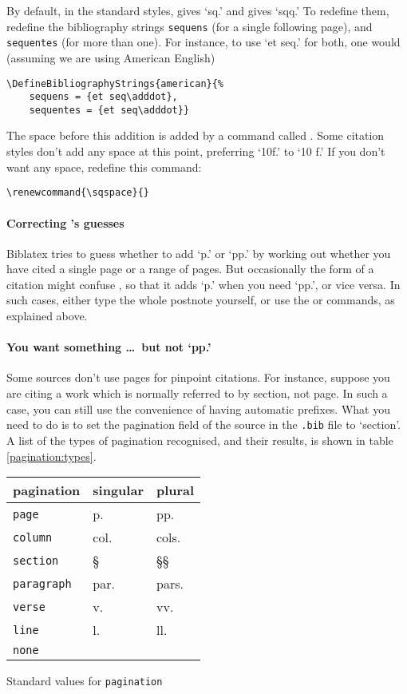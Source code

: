 By default, in the standard styles,  gives `sq.' and 
gives `sqq.' To redefine them, redefine the bibliography strings
\verb|sequens| (for a single following page), and \verb|sequentes|
(for more than one). For instance, to use `et seq.' for both, one
would (assuming we are using American English)
\begin{verbatim}
\DefineBibliographyStrings{american}{%
    sequens = {et seq\adddot},
    sequentes = {et seq\adddot}}
\end{verbatim}
The space before this addition is added by a command called
. Some citation styles don't add any space at this point,
preferring `10f.' to `10 f.' If you don't want any space, redefine
this command:
\begin{center}
\verb|\renewcommand{\sqspace}{}|
\end{center}

\paragraph{Correcting \biblatex's guesses} \textsf{Biblatex} tries to
guess whether to add `p.' or `pp.' by working out whether you have
cited a single page or a range of pages. But occasionally the form of a
citation might confuse \biblatex, so that it adds `p.' when you need
`pp.', or vice versa. In such cases, either type the whole postnote
yourself, or use the  or  commands, as explained above.

\paragraph{You want something \ldots\ but not `pp.'} Some sources
don't use pages for pinpoint citations. For instance, suppose you
are citing a work which is normally referred to by section, not
page. In such a case, you can still use the convenience of having
automatic prefixes. What you need to do is to set the pagination field
of the source in the \texttt{.bib} file to `section'. A list of the
types of pagination recognised, and their results, is shown in table \ref{pagination:types}.
\begin{margintable}
\begin{tabular}{lll}
  \toprule
  \textsf{pagination} & \textsf{singular} & \textsf{plural} \\
  \midrule
  \texttt{page} & p. & pp. \\
  \texttt{column} & col. & cols. \\
  \texttt{section} & \S & \S\S \\
  \texttt{paragraph} & par. & pars. \\
  \texttt{verse} & v. & vv. \\
  \texttt{line} & l. & ll. \\
  \texttt{none} \\
  \bottomrule
\end{tabular}
\caption{Standard values for \texttt{pagination}\label{pagination:types}}
\end{margintable}


